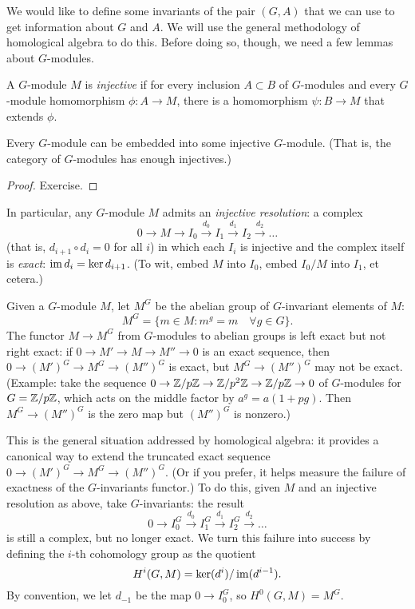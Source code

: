 We would like to define some invariants of the pair $(G, A)$
that we can use to get information about $G$ and $A$. We will use
the general methodology of homological algebra to do this.
Before doing so, though,
we need a few lemmas about $G$-modules.

A $G$-module $M$ is \emph{injective} if for every inclusion $A \subset B$
of $G$-modules and every $G$-module homomorphism $\phi: A \to M$, there
is a homomorphism $\psi: B \to M$ that extends $\phi$.

\begin{lemma} \label{L:enough injectives}
Every $G$-module can be embedded into some injective $G$-module. (That is,
the category of $G$-modules has enough injectives.)
\end{lemma}
\begin{proof}
Exercise.
\end{proof}

In particular, any $G$-module $M$ admits an \emph{injective resolution}:
a complex
\[
0 \to M \to I_0 \stackrel{d_0}{\to} I_1 \stackrel{d_1}{\to} I_2
\stackrel{d_2}{\to} \dots
\]
(that is, $d_{i+1} \circ d_i = 0$ for all $i$)
in which each $I_i$ is injective and the complex itself is \emph{exact}:
$\operatorname{im} d_i = \ker d_{i+1}$.
(To wit, embed $M$ into $I_0$, embed $I_0/M$ into $I_1$, et cetera.)

Given a $G$-module $M$, let $M^G$ be the abelian group of $G$-invariant
elements of $M$:
\[
M^G = \{m \in M: m^g = m \quad \forall g \in G\}.
\]
The functor $M \to M^G$ from $G$-modules to abelian groups is left exact but 
not right exact: if $0 \to M' \to M \to M'' \to 0$ is an exact sequence,
then $0 \to (M')^G \to M^G \to (M'')^G$ is exact, but $M^G \to (M'')^G$ may
not be exact. (Example: take the sequence $0 \to \mathbb{Z}/p\mathbb{Z} \to \mathbb{Z}/p^2\mathbb{Z}
\to \mathbb{Z}/p\mathbb{Z} \to 0$ of $G$-modules for $G = \mathbb{Z}/p\mathbb{Z}$, which acts on the middle
factor by $a^g = a(1+pg)$. Then $M^G \to (M'')^G$ is the zero map but
$(M'')^G$ is nonzero.)

This is the general situation addressed by homological algebra: it provides
a canonical way to extend the truncated exact sequence
$0 \to (M')^G \to M^G \to (M'')^G$. (Or if you prefer, it helps measure the
failure of exactness of the $G$-invariants functor.) To do this, given
$M$ and an injective resolution as above, take $G$-invariants:
the result
\[
0 \to I_0^G \stackrel{d_0}{\to} I_1^G \stackrel{d_1}{\to} I_2^G
\stackrel{d_2}{\to} \dots
\]
is still a complex, but no longer exact. We turn this failure into success
by defining the $i$-th cohomology group as the quotient
\[
H^i(G, M) = \ker(d^i)/\operatorname{im}(d^{i-1}).
\]
By convention, we let $d_{-1}$ be the map $0 \to I_0^G$, so
$H^0(G,M)=M^G$.

